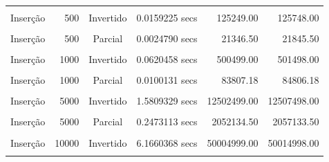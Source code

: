 \documentclass[
]{article}
\begin{document}
\begin{longtable}[l]{lrccrr}
\endfoot
\bottomrule
\endlastfoot
\cellcolor{gray!15}{Inserção} & \cellcolor{gray!15}{500} & \cellcolor{gray!15}{Aleatório} & \cellcolor{gray!15}{0.0073818 secs} & \cellcolor{gray!15}{63175.45} & \cellcolor{gray!15}{63674.45}\\
Inserção & 500 & Invertido & 0.0159225 secs & 125249.00 & 125748.00\\
\cellcolor{gray!15}{Inserção} & \cellcolor{gray!15}{500} & \cellcolor{gray!15}{Ordenado} & \cellcolor{gray!15}{0.0000772 secs} & \cellcolor{gray!15}{499.00} & \cellcolor{gray!15}{998.00}\\
Inserção & 500 & Parcial & 0.0024790 secs & 21346.50 & 21845.50\\
\cellcolor{gray!15}{Inserção} & \cellcolor{gray!15}{1000} & \cellcolor{gray!15}{Aleatório} & \cellcolor{gray!15}{0.0300949 secs} & \cellcolor{gray!15}{251098.85} & \cellcolor{gray!15}{252097.85}\\
Inserção & 1000 & Invertido & 0.0620458 secs & 500499.00 & 501498.00\\
\cellcolor{gray!15}{Inserção} & \cellcolor{gray!15}{1000} & \cellcolor{gray!15}{Ordenado} & \cellcolor{gray!15}{0.0001290 secs} & \cellcolor{gray!15}{999.00} & \cellcolor{gray!15}{1998.00}\\
Inserção & 1000 & Parcial & 0.0100131 secs & 83807.18 & 84806.18\\
\cellcolor{gray!15}{Inserção} & \cellcolor{gray!15}{5000} & \cellcolor{gray!15}{Aleatório} & \cellcolor{gray!15}{0.7530582 secs} & \cellcolor{gray!15}{6247376.11} & \cellcolor{gray!15}{6252375.11}\\
Inserção & 5000 & Invertido & 1.5809329 secs & 12502499.00 & 12507498.00\\
\cellcolor{gray!15}{Inserção} & \cellcolor{gray!15}{5000} & \cellcolor{gray!15}{Ordenado} & \cellcolor{gray!15}{0.0006828 secs} & \cellcolor{gray!15}{4999.00} & \cellcolor{gray!15}{9998.00}\\
Inserção & 5000 & Parcial & 0.2473113 secs & 2052134.50 & 2057133.50\\
\cellcolor{gray!15}{Inserção} & \cellcolor{gray!15}{10000} & \cellcolor{gray!15}{Aleatório} & \cellcolor{gray!15}{3.0103041 secs} & \cellcolor{gray!15}{24992830.95} & \cellcolor{gray!15}{25002829.95}\\
Inserção & 10000 & Invertido & 6.1660368 secs & 50004999.00 & 50014998.00\\
\cellcolor{gray!15}{Inserção} & \cellcolor{gray!15}{10000} & \cellcolor{gray!15}{Ordenado} & \cellcolor{gray!15}{0.0013168 secs} & \cellcolor{gray!15}{9999.00} & \cellcolor{gray!15}{19998.00}\\

\end{longtable}
\end{document}
